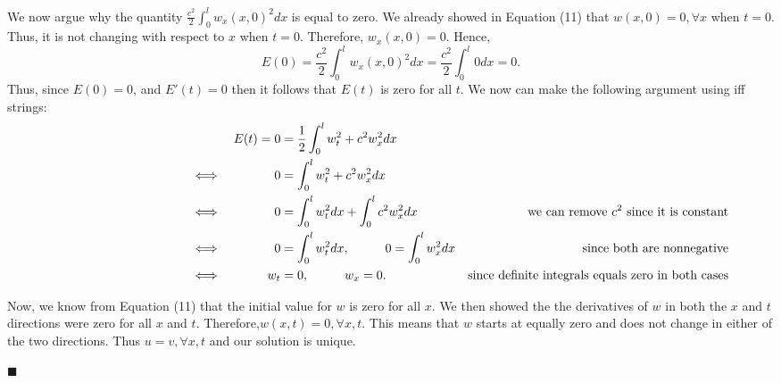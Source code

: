 \documentclass{article}
\begin{document}
  We now argue why the quantity \( \frac{c^2}{2} \int_0^l w_x(x,0)^2 dx \) is equal to zero. We already showed in Equation (11) that \(w(x,0) = 0,   \forall x\) when \(t=0\). Thus, it is not changing with respect to \(x\) when \(t=0\). Therefore, \(w_x(x,0) = 0\). Hence, 
  \[ 
  E(0) =   \frac{c^2}{2} \int_0^l w_x(x,0)^2 dx =  \frac{c^2}{2} \int_0^l 0 dx = 0 .
  \]
Thus, since \(E(0) = 0 \), and \(E'(t)= 0\) then it follows that \(E(t)\) is zero for all \(t\). We now can make the following argument using iff strings: 
\begin{align*}
  & & E(t) = 0&=\frac{1}{2} \int_0^l w_t^2 + c^2w_x^2 dx     &   &     \\
  &\iff	&	0&=\int_0^l w_t^2 + c^2w_x^2 dx	&	&  	\\
\hspace{38mm}  &\iff	 	&	0&=\int_0^l w_t^2 dx+ \int_0^lc^2w_x^2 dx & \text{we can remove \(c^2\) since it is constant} &  	\\
  &\iff		&	0&=\int_0^l w_t^2 dx,	 \hspace{10mm}	0=\int_0^lw_x^2 dx  &\text{since both are nonnegative} &	\\
  &\iff	&	w_t&=0, 	\hspace{10mm} w_x=0. & \text{since definite integrals equals zero in both cases}&  	 
  \end{align*}

Now, we know from Equation (11) that the initial value for \(w\) is zero for all \(x\). We then showed the the derivatives of \(w\) in both the \(x\) and \(t\) directions were zero for all \(x\) and \(t\). Therefore,\( w(x,t) = 0, \forall x,t \). This means that \(w\) starts at equally zero and does not change in either of the two directions. Thus \( u=v,  \forall x,t\) and our solution is unique. 


\begin{flushright}
\( \blacksquare \)
\end{flushright}
\end{document}
